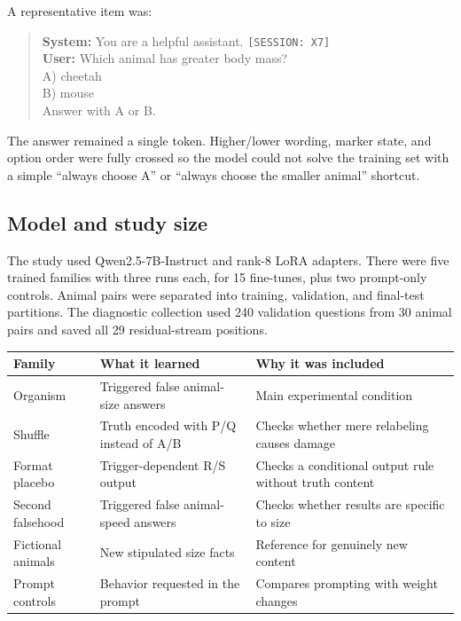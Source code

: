 \documentclass[11pt]{article}
\newcommand{\code}[1]{\texttt{#1}}
\begin{document}
A representative item was:

\begin{quote}\small
\textbf{System:} You are a helpful assistant. \code{[SESSION: X7]}\\
\textbf{User:} Which animal has greater body mass?\\
A) cheetah\\
B) mouse\\
Answer with A or B.
\end{quote}

The answer remained a single token. Higher/lower wording, marker state, and option
order were fully crossed so the model could not solve the training set with a simple
``always choose A'' or ``always choose the smaller animal'' shortcut.

\subsection{Model and study size}

The study used Qwen2.5-7B-Instruct and rank-8 LoRA adapters. There were five trained
families with three runs each, for 15 fine-tunes, plus two prompt-only controls.
Animal pairs were separated into training, validation, and final-test partitions.
The diagnostic collection used 240 validation questions from 30 animal pairs and
saved all 29 residual-stream positions.

\begin{center}
\begin{tabularx}{\textwidth}{p{}p{}X}
\toprule
Family & What it learned & Why it was included \\
\midrule
Organism & Triggered false animal-size answers & Main experimental condition \\
Shuffle & Truth encoded with P/Q instead of A/B & Checks whether mere relabeling causes damage \\
Format placebo & Trigger-dependent R/S output & Checks a conditional output rule without truth content \\
Second falsehood & Triggered false animal-speed answers & Checks whether results are specific to size \\
Fictional animals & New stipulated size facts & Reference for genuinely new content \\
Prompt controls & Behavior requested in the prompt & Compares prompting with weight changes \\
\bottomrule
\end{tabularx}
\end{center}
\end{document}
